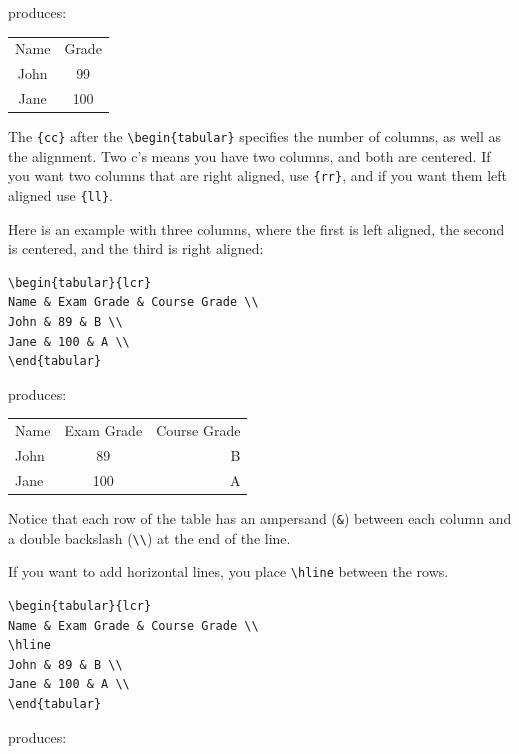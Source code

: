\documentclass[12pt]{article}
\begin{document}
produces:

\begin{tabular}{cc}
Name & Grade \\
John & 99 \\
Jane & 100 \\
\end{tabular}

The \verb|{cc}| after the \verb|\begin{tabular}| specifies the number of columns, as well as the alignment. Two c's means you have two columns, and both are centered. If you want two columns that are right aligned, use \verb|{rr}|, and if you want them left aligned use \verb|{ll}|.

Here is an example with three columns, where the first is left aligned, the second is centered, and the third is right aligned:

\begin{verbatim}
\begin{tabular}{lcr}
Name & Exam Grade & Course Grade \\
John & 89 & B \\
Jane & 100 & A \\
\end{tabular}
\end{verbatim}

produces:

\begin{tabular}{lcr}
Name & Exam Grade & Course Grade \\
John & 89 & B \\
Jane & 100 & A \\
\end{tabular}

Notice that each row of the table has an ampersand (\verb|&|) between each column and a double backslash (\verb|\\|) at the end of the line.

If you want to add horizontal lines, you place \verb|\hline| between the rows.

\begin{verbatim}
\begin{tabular}{lcr}
Name & Exam Grade & Course Grade \\
\hline
John & 89 & B \\
Jane & 100 & A \\
\end{tabular}
\end{verbatim}

produces:
\end{document}

